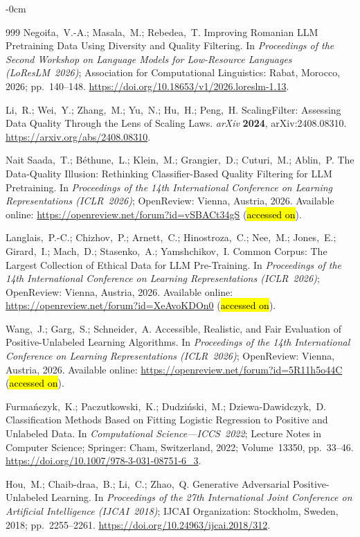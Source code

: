 \documentclass[applsci,article,accept,pdftex,moreauthors]{Definitions/mdpi}
\begin{document}
\begin{adjustwidth}{-\extralength}{0cm}
\begin{thebibliography}{999}
Negoi\'{t}a,~V.-A.; Masala,~M.; Rebedea,~T.
Improving Romanian LLM Pretraining Data Using Diversity and Quality Filtering.
In \textit{Proceedings of the Second Workshop on Language Models for
Low-Resource Languages (LoResLM~2026)};
Association for Computational Linguistics: Rabat, Morocco, 2026; pp.~140--148.
\url{https://doi.org/10.18653/v1/2026.loreslm-1.13}.

Li,~R.; Wei,~Y.; Zhang,~M.; Yu,~N.; Hu,~H.; Peng,~H.
ScalingFilter: Assessing Data Quality Through the Lens of Scaling Laws.
\textit{arXiv} \textbf{2024}, arXiv:2408.08310.
\url{https://arxiv.org/abs/2408.08310}.

Nait Saada,~T.; B\'{e}thune,~L.; Klein,~M.; Grangier,~D.; Cuturi,~M.; Ablin,~P.
The Data-Quality Illusion: Rethinking Classifier-Based Quality Filtering
for LLM Pretraining.
In \textit{Proceedings of the 14th International Conference on Learning
Representations (ICLR~2026)}; OpenReview: Vienna, Austria, 2026.
Available online: \url{https://openreview.net/forum?id=vSBACt34gS} (\hl{accessed on}).

Langlais,~P.-C.; Chizhov,~P.; Arnett,~C.; Hinostroza,~C.; Nee,~M.;
Jones,~E.; Girard,~I.; Mach,~D.; Stasenko,~A.; Yamshchikov,~I.
Common Corpus: The Largest Collection of Ethical Data for LLM Pre-Training.
In \textit{Proceedings of the 14th International Conference on Learning
Representations (ICLR~2026)};
OpenReview: Vienna, Austria, 2026.
Available online: \url{https://openreview.net/forum?id=XeAvoKDOn0} (\hl{accessed on}). 

Wang,~J.; Garg,~S.; Schneider,~A.
Accessible, Realistic, and Fair Evaluation of Positive-Unlabeled
Learning Algorithms.
In \textit{Proceedings of the 14th International Conference on Learning
Representations (ICLR~2026)};
OpenReview: Vienna, Austria, 2026.
Available online: \url{https://openreview.net/forum?id=5R11h5o44C} (\hl{accessed on}). 

Furma\'{n}czyk,~K.; Paczutkowski,~K.; Dudzi\'{n}ski,~M.; Dziewa-Dawidczyk,~D.
Classification Methods Based on Fitting Logistic Regression to Positive
and Unlabeled Data.
In \textit{Computational Science---ICCS~2022};
Lecture Notes in Computer Science;
Springer: Cham, Switzerland, 2022; Volume~13350, pp.~33--46.
\url{https://doi.org/10.1007/978-3-031-08751-6_3}.

Hou,~M.; Chaib-draa,~B.; Li,~C.; Zhao,~Q.
Generative Adversarial Positive-Unlabeled Learning.
In \textit{Proceedings of the 27th International Joint Conference on
Artificial Intelligence (IJCAI~2018)};
IJCAI Organization: Stockholm, Sweden, 2018; pp.~2255--2261.
\url{https://doi.org/10.24963/ijcai.2018/312}.


\end{thebibliography}
\end{adjustwidth}
\end{document}
